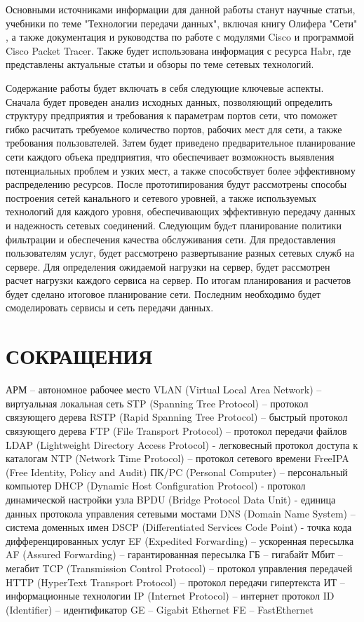 \documentclass[14pt, a4paper]{extarticle}
\numberwithin{equation}{section}
\begin{document}
Основными источниками информации 
для данной работы станут научные статьи, 
учебники по теме "Технологии передачи данных", 
включая книгу Олифера "Сети" \cite{olifer}, 
а также документация и руководства по работе 
с модулями Cisco и программой 
Cisco Packet Tracer. Также будет использована 
информация с ресурса Habr, 
где представлены актуальные статьи и обзоры 
по теме сетевых технологий.

Содержание работы будет включать в себя следующие ключевые аспекты. 
Сначала будет проведен анализ исходных данных, позволяющий определить структуру предприятия и 
требования к параметрам портов сети, что поможет гибко расчитать требуемое количество портов, 
рабочих мест для сети, а также требования пользователей. 
Затем будет приведено предварительное планирование сети каждого объека предприятия, что 
обеспечивает возможность выявления потенциальных проблем и узких мест, 
а также способствует более эффективному распределению ресурсов. 
После прототипирования будут рассмотрены способы построения сетей канального и сетевого уровней,
а также используемых технологий для каждого уровня, обеспечивающих эффективную передачу данных и надежность сетевых соединений.
Следующим будeт планирование политики фильтрации и обеспечения качества обслуживания сети.
Для предоставления пользователям услуг, будет рассмотрено развертывание разных сетевых служб на сервере.
Для определения ожидаемой нагрузки на сервер, будет рассмотрен расчет нагрузки каждого сервиса на сервер.
По итогам планирования и расчетов будет сделано итоговое планирование сети.
Последним необходимо будет смоделировать сервисы и сеть передачи данных.



\section*{СОКРАЩЕНИЯ}
АРМ – автономное рабочее место
VLAN (Virtual Local Area Network) – виртуальная локальная сеть
STP (Spanning Tree Protocol) – протокол связующего дерева
RSTP (Rapid Spanning Tree Protocol) – быстрый протокол связующего дерева
FTP (File Transport Protocol) – протокол передачи файлов
LDAP (Lightweight Directory Access Protocol) - легковесный протокол доступа к
каталогам
NTP (Network Time Protocol) – протокол сетевого времени
FreeIPA (Free Identity, Policy and Audit)
ПК/PC (Personal Computer) – персональный компьютер
DHCP (Dynamic Host Configuration Protocol) - протокол динамической
настройки узла
BPDU (Bridge Protocol Data Unit) - единица данных протокола управления
сетевыми мостами
DNS (Domain Name System) – система доменных имен
DSCP (Differentiated Services Code Point) - точка кода дифференцированных
услуг
EF (Expedited Forwarding) – ускоренная пересылка
AF (Assured Forwarding) – гарантированная пересылка
ГБ – гигабайт
Мбит – мегабит
TCP (Transmission Control Protocol) – протокол управления передачей
HTTP (HyperText Transport Protocol) – протокол передачи гипертекста
ИТ – информационные технологии
IP (Internet Protocol) – интернет протокол
ID (Identifier) – идентификатор
GE – Gigabit Ethernet
FE – FastEthernet
\end{document}
